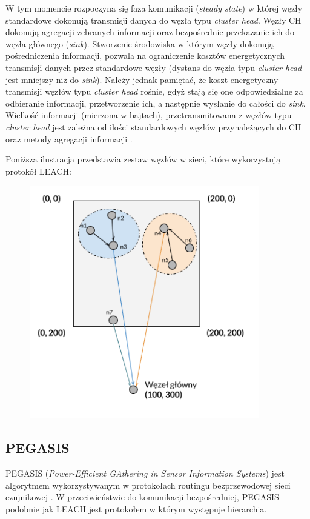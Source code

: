 \documentclass[a4paper,12pt,twoside,openany]{report}
\begin{document}
W tym momencie rozpoczyna się faza komunikacji (\textit{steady state}) w której węzły standardowe dokonują transmisji danych do  węzła typu \textit{cluster head}.
Węzły CH dokonują agregacji zebranych informacji oraz bezpośrednie przekazanie ich do węzła głównego (\textit{sink}).
Stworzenie środowiska w którym węzły dokonują pośredniczenia informacji, pozwala na ograniczenie kosztów energetycznych transmisji danych przez
standardowe węzły (dystans do węzła typu \textit{cluster head} jest mniejszy niż do \textit{sink}). Należy jednak pamiętać, że koszt energetyczny transmisji węzłów typu \textit{cluster head}
rośnie, gdyż stają się one odpowiedzialne za odbieranie informacji, przetworzenie ich, a następnie wysłanie do całości do \textit{sink}. Wielkość informacji (mierzona w bajtach), przetransmitowana 
z węzłów typu \textit{cluster head} jest zależna od ilości standardowych węzłów przynależących do CH oraz metody agregacji informacji \cite{pega-aggregacja} \cite{pega-compression}.

Poniższa ilustracja przedstawia zestaw węzłów w sieci, które wykorzystują protokół LEACH:

\begin{figure}[H]
 \centering
 \includegraphics[width=10cm]{images/komunikacja_leach.png} 
\end{figure}

\subsection{PEGASIS}

PEGASIS (\textit{Power-Efficient GAthering in Sensor Information Systems}) jest algorytmem wykorzystywanym w protokołach routingu bezprzewodowej sieci czujnikowej \cite{Lindsey-Pegasis}.
W przeciwieństwie do komunikacji bezpośredniej, PEGASIS podobnie jak LEACH jest protokołem w którym występuje hierarchia.
\end{document}
